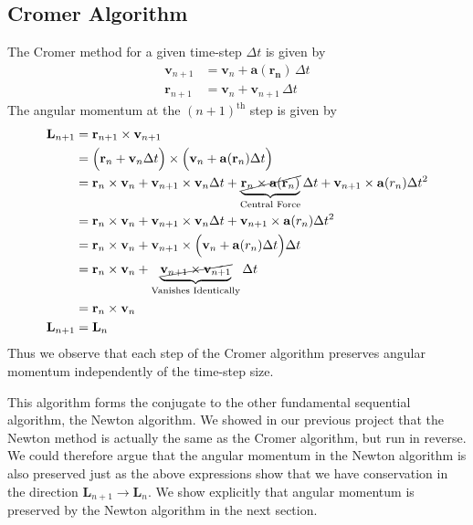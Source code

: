 \documentclass[8pt,a4paper]{article}
\begin{document}
	\subsection{Cromer Algorithm}
	The Cromer method for a given time-step $\Delta t$ is given by
	\begin{align} \label{cromer}
		\mathbf{v}_{n+1} &= \mathbf{v}_n + \mathbf{a} (\mathbf{r_n}) \,\Delta t \nonumber \\
		\mathbf{r}_{n+1} &= \mathbf{v}_n + \mathbf{v}_{n+1} \,\Delta t
	\end{align}
	The angular momentum at the $(n+1)^\mathrm{th}$ step is given by
	\begin{align}
		\mathbf{L}_{n+1} &= \mathbf{r}_{n+1} \times \mathbf{v}_{n+1} \nonumber \\
		&= \Big(\mathbf{r}_n + \mathbf{v}_n \Delta t\Big) \times
		\Big(\mathbf{v}_n + \mathbf{a}(\mathbf{r}_n) \Delta t\Big) \nonumber \\
		&= \mathbf{r}_n\times\mathbf{v}_n + \mathbf{v}_{n+1}\times\mathbf{v}_n \Delta t + \underbrace{\cancel{\mathbf{r}_n \times \mathbf{a}(\mathbf{r}_n)}}_{\text{Central Force}}\Delta t + \mathbf{v}_{n+1} \times \mathbf{a}(r_n) \Delta t ^2 \nonumber \\
		&= \mathbf{r}_n\times\mathbf{v}_n + \mathbf{v}_{n+1}\times\mathbf{v}_n \Delta t + \mathbf{v}_{n+1} \times \mathbf{a}(r_n) \Delta t ^2 \nonumber \\
		&= \mathbf{r}_n\times\mathbf{v}_n + \mathbf{v}_{n+1}\times \Big(\mathbf{v}_n + \mathbf{a}(r_n) \Delta t \Big) \Delta t \nonumber \\
		&= \mathbf{r}_n\times\mathbf{v}_n + \underbrace{\cancel{\mathbf{v}_{n+1}\times \mathbf{v}_{n+1}}}_{\text{Vanishes Identically}} \Delta t \nonumber \\
		&= \mathbf{r}_n\times\mathbf{v}_n \nonumber \\
		\mathbf{L}_{n+1}	&= \mathbf{L}_n
	\end{align}
	Thus we observe that each step of the Cromer algorithm preserves angular momentum independently of the time-step size.
	
	This algorithm forms the conjugate to the other fundamental sequential algorithm, the Newton algorithm. We showed in our previous project that the Newton method is actually the same as the Cromer algorithm, but run in reverse. We could therefore argue that the angular momentum in the Newton algorithm is also preserved just as the above expressions show that we have conservation in the direction $\mathbf{L}_{n+1} \rightarrow \mathbf{L}_n$. We show explicitly that angular momentum is preserved by the Newton algorithm in the next section.
\end{document}

